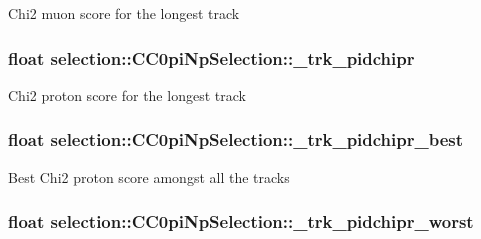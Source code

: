 Chi2 muon score for the longest track \hypertarget{classselection_1_1CC0piNpSelection_a712eaf6dc6086f1be5705a3bbe5226fc}{
\subsubsection[{\-\_\-trk\-\_\-pidchipr}]{\setlength{\rightskip}{0pt plus 5cm}float selection\-::\-C\-C0pi\-Np\-Selection\-::\-\_\-trk\-\_\-pidchipr\hspace{0.3cm}{\ttfamily [private]}}}\label{classselection_1_1CC0piNpSelection_a712eaf6dc6086f1be5705a3bbe5226fc}
Chi2 proton score for the longest track \hypertarget{classselection_1_1CC0piNpSelection_aaf0a2841494bc52da55d267bc3c8db3d}{
\subsubsection[{\-\_\-trk\-\_\-pidchipr\-\_\-best}]{\setlength{\rightskip}{0pt plus 5cm}float selection\-::\-C\-C0pi\-Np\-Selection\-::\-\_\-trk\-\_\-pidchipr\-\_\-best\hspace{0.3cm}{\ttfamily [private]}}}\label{classselection_1_1CC0piNpSelection_aaf0a2841494bc52da55d267bc3c8db3d}
Best Chi2 proton score amongst all the tracks \hypertarget{classselection_1_1CC0piNpSelection_a6c06ff43f89cbee19cf466b830a6fe38}{
\subsubsection[{\-\_\-trk\-\_\-pidchipr\-\_\-worst}]{\setlength{\rightskip}{0pt plus 5cm}float selection\-::\-C\-C0pi\-Np\-Selection\-::\-\_\-trk\-\_\-pidchipr\-\_\-worst\hspace{0.3cm}{\ttfamily [private]}}}\label{classselection_1_1CC0piNpSelection_a6c06ff43f89cbee19cf466b830a6fe38}

